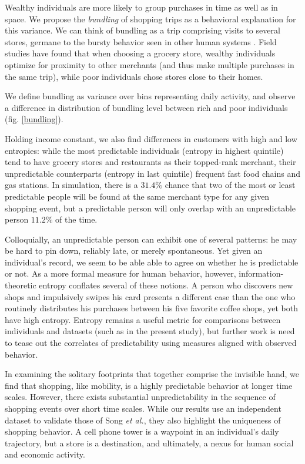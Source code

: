 \documentclass[twocolumn,floatfix]{revtex4}
\begin{document}
Wealthy individuals are more likely to group purchases in time as well as in space. We propose the {\it bundling} of shopping trips as a behavioral explanation for this variance. We can think of bundling as a trip comprising visits to several stores, germane to the bursty behavior seen in other human systems \cite{barabasi2005origin}. Field studies \cite{lloyd1978shopping} have found that when choosing a grocery store, wealthy individuals optimize for proximity to other merchants (and thus make multiple purchases in the same trip), while poor individuals chose stores close to their homes.  

We define bundling as variance over bins representing daily activity, and observe a difference in distribution of bundling level between rich and poor individuals (fig.  \ref{bundling}). 

Holding income constant, we also find differences in customers with high and low entropies: while the most predictable individuals (entropy in highest quintile) tend to have grocery stores and restaurants as their topped-rank merchant, their unpredictable counterparts (entropy in last quintile) frequent fast food chains and gas stations. In simulation, there is a $31.4\%$ chance that two of the most or least predictable people will be found at the same merchant type for any given shopping event, but a predictable person will only overlap with an unpredictable person $11.2\%$ of the time. 


Colloquially, an unpredictable person can exhibit one of several patterns: he may be hard to pin down, reliably late, or merely spontaneous. Yet given an individual's record, we seem to be able able to agree on whether he is predictable or not. As a more formal measure for human behavior, however, information-theoretic entropy conflates several of these notions. A person who discovers new shops and impulsively swipes his card presents a different case than the one who routinely distributes his purchases between his five favorite coffee shops, yet both have high entropy. Entropy remains a useful metric for comparisons between individuals and datasets (such as in the present study), but further work is need to tease out the correlates of predictability using measures aligned with observed behavior. 

In examining the solitary footprints that together comprise the invisible hand, we find that shopping, like mobility, is a highly predictable behavior at longer time scales. However, there exists substantial unpredictability in the sequence of shopping events over short time scales. While our results use an independent dataset to validate those of Song {\it et al.}, they also highlight the uniqueness of shopping behavior. A cell phone tower is a waypoint in an individual's daily trajectory, but a store is a destination, and ultimately, a nexus for human social and economic activity.


\end{document}
